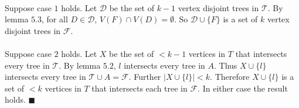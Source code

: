 \documentclass[letterpaper,12pt,oneside,onecolumn]{report}
\begin{document}
\paragraph{}
Suppose case $1$ holds. Let $\mathcal{D}$ be the set of $k-1$ vertex disjoint trees in $\mathcal{T}$. By lemma $5.3$, for all $D \in \mathcal{D}$, $V(F) \cap V(D) = \emptyset$. So $\mathcal{D} \cup \{F\}$ is a set of $k$ vertex disjoint trees in $\mathcal{F}$.
\paragraph{}
Suppose case $2$ holds. Let $X$ be the set of $< k-1$ vertices in $T$ that intersects every tree in $\mathcal{T}$. By lemma $5.2$, $l$ intersects every tree in $A$. Thus $X \cup \{l\}$ intersects every tree in $\mathcal{T} \cup A = \mathcal{F}$. Further $|X \cup \{l\}| < k$. Therefore $X \cup \{l\}$ is a set of $< k$ vertices in $T$ that intersects each tree in $\mathcal{F}$. In either case the result holds. $\blacksquare$  
\end{document}
